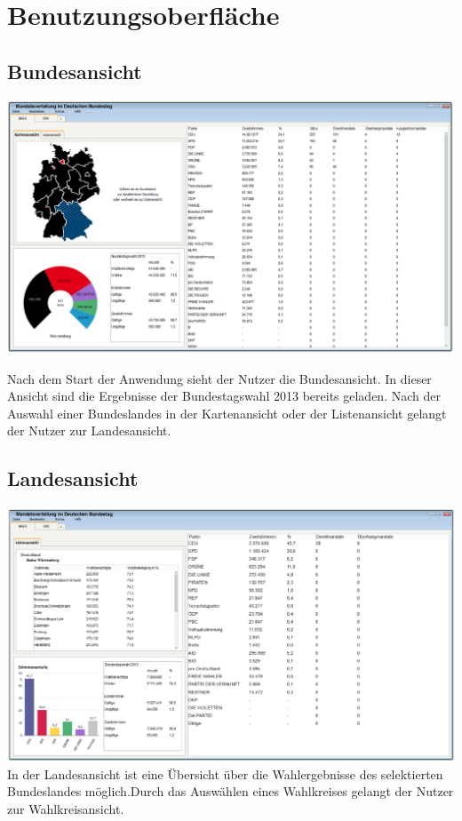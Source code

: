 \documentclass[10pt,a4paper]{article}
\begin{document}
\section{Benutzungsoberfläche}
\subsection{Bundesansicht}
\includegraphics[scale=0.3]{Bundesansicht.png}

\noindent Nach dem Start der Anwendung sieht der Nutzer die Bundesansicht.
In dieser Ansicht sind die Ergebnisse der Bundestagswahl 2013 bereits geladen.
Nach der Auswahl einer Bundeslandes in der Kartenansicht oder der Listenansicht gelangt der Nutzer zur Landesansicht.
\newpage
\subsection{Landesansicht}
\includegraphics[scale=0.3]{Landesansicht.png}
\noindent In der Landesansicht ist eine Übersicht über die Wahlergebnisse des selektierten Bundeslandes möglich.Durch das Auswählen eines Wahlkreises gelangt der Nutzer zur Wahlkreisansicht.
\newpage
\end{document}
